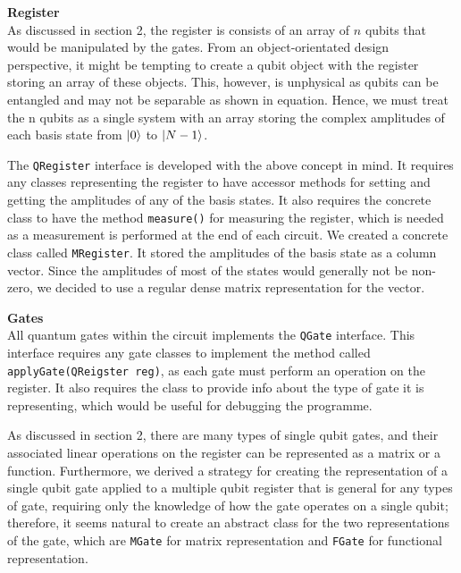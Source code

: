 \documentclass[bibliography=totocnumbered, 10pt]{article}
\theoremstyle{NoticeStyle}
\begin{document}
\begin{myenumerate}
	\item \textbf{Register}\\
	As discussed in section 2, the register is consists of an array of $n$ qubits that would be manipulated by the gates. From an object-orientated design perspective, it might be tempting to create a qubit object with the register storing an array of these objects. This, however, is unphysical as qubits can be entangled and may not be separable as shown in equation. Hence, we must treat the n qubits as a single system with an array storing the complex amplitudes of each basis state from ${\left\vert{0}\right\rangle}$ to ${\left\vert{N-1}\right\rangle}$. 

The \texttt{QRegister} interface is developed with the above concept in mind. It requires any classes representing the register to have accessor methods for setting and getting the amplitudes of any of the basis states. It also requires the concrete class to have the method \texttt{measure()} for measuring the register, which is needed as a measurement is performed at the end of each circuit. We created a concrete class called \texttt{MRegister}. It stored the amplitudes of the basis state as a column vector. Since the amplitudes of most of the states would generally not be non-zero, we decided to use a regular dense matrix representation for the vector. 

	\item \textbf{Gates}\\
	All quantum gates within the circuit implements the \texttt{QGate} interface. This interface requires any gate classes to implement the method called \texttt{applyGate(QReigster reg)}, as each gate must perform an operation on the register. It also requires the class to provide info about the type of gate it is representing, which would be useful for debugging the programme.

As discussed in section 2, there are many types of single qubit gates, and their associated linear operations on the register can be represented as a matrix or a function. Furthermore, we derived a strategy for creating the representation of a single qubit gate applied to a multiple qubit register that is general for any types of gate, requiring only the knowledge of how the gate operates on a single qubit; therefore, it seems natural to create an abstract class for the two representations of the gate, which are \texttt{MGate} for matrix representation and \texttt{FGate} for functional representation.


\end{myenumerate}
\end{document}
